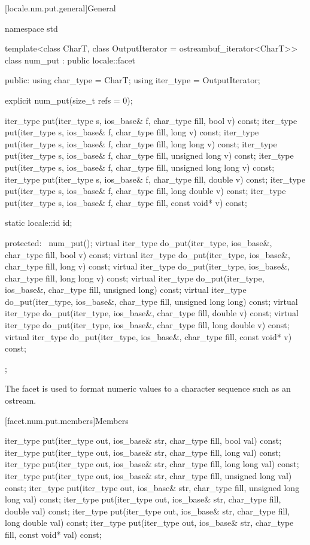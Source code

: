 [locale.nm.put.general]{General}

%
\begin{codeblock}
namespace std {
  template<class CharT, class OutputIterator = ostreambuf_iterator<CharT>>
    class num_put : public locale::facet {
    public:
      using char_type = CharT;
      using iter_type = OutputIterator;

      explicit num_put(size_t refs = 0);

      iter_type put(iter_type s, ios_base& f, char_type fill, bool v) const;
      iter_type put(iter_type s, ios_base& f, char_type fill, long v) const;
      iter_type put(iter_type s, ios_base& f, char_type fill, long long v) const;
      iter_type put(iter_type s, ios_base& f, char_type fill, unsigned long v) const;
      iter_type put(iter_type s, ios_base& f, char_type fill, unsigned long long v) const;
      iter_type put(iter_type s, ios_base& f, char_type fill, double v) const;
      iter_type put(iter_type s, ios_base& f, char_type fill, long double v) const;
      iter_type put(iter_type s, ios_base& f, char_type fill, const void* v) const;

      static locale::id id;

    protected:
      ~num_put();
      virtual iter_type do_put(iter_type, ios_base&, char_type fill, bool v) const;
      virtual iter_type do_put(iter_type, ios_base&, char_type fill, long v) const;
      virtual iter_type do_put(iter_type, ios_base&, char_type fill, long long v) const;
      virtual iter_type do_put(iter_type, ios_base&, char_type fill, unsigned long) const;
      virtual iter_type do_put(iter_type, ios_base&, char_type fill, unsigned long long) const;
      virtual iter_type do_put(iter_type, ios_base&, char_type fill, double v) const;
      virtual iter_type do_put(iter_type, ios_base&, char_type fill, long double v) const;
      virtual iter_type do_put(iter_type, ios_base&, char_type fill, const void* v) const;
    };
}
\end{codeblock}

\pnum
The facet
is used to format numeric values to a character sequence such as an ostream.

[facet.num.put.members]{Members}

%
\begin{itemdecl}
iter_type put(iter_type out, ios_base& str, char_type fill, bool val) const;
iter_type put(iter_type out, ios_base& str, char_type fill, long val) const;
iter_type put(iter_type out, ios_base& str, char_type fill, long long val) const;
iter_type put(iter_type out, ios_base& str, char_type fill, unsigned long val) const;
iter_type put(iter_type out, ios_base& str, char_type fill, unsigned long long val) const;
iter_type put(iter_type out, ios_base& str, char_type fill, double val) const;
iter_type put(iter_type out, ios_base& str, char_type fill, long double val) const;
iter_type put(iter_type out, ios_base& str, char_type fill, const void* val) const;
\end{itemdecl}

